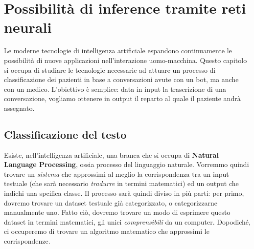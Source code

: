 \chapter{Possibilità di inference tramite reti neurali}
\label{chap:inference}
Le moderne tecnologie di intelligenza artificiale espandono continuamente le possibilità di nuove applicazioni nell'interazione uomo-macchina.
Questo capitolo si occupa di studiare le tecnologie necessarie ad attuare un processo di classificazione dei pazienti in base a conversazioni avute con un bot, ma anche con un medico.
L'obiettivo è semplice: data in input la trascrizione di una conversazione, vogliamo ottenere in output il reparto al quale il paziente andrà assegnato.
\section{Classificazione del testo}
Esiste, nell'intelligenza artificiale, una branca che si occupa di \textbf{Natural Language Processing}, ossia processo del linguaggio naturale. Vorremmo quindi trovare un \textit{sistema} che approssimi al meglio la corrispondenza tra un input testuale (che sarà necessario \textit{tradurre} in termini matematici) ed un output che indichi una spcifica classe. Il processo sarà quindi diviso in più parti: per primo, dovremo trovare un dataset testuale già categorizzato, o categorizzarne manualmente uno. Fatto ciò, dovremo trovare un modo di esprimere questo dataset in termini matematici, gli unici \textit{comprensibili} da un computer. Dopodiché, ci occuperemo di trovare un algoritmo matematico che approssimi le corrispondenze.

